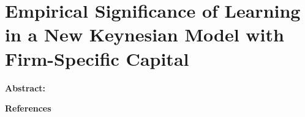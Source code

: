 \chapter{Empirical Significance of Learning in a New Keynesian Model with Firm-Specific Capital}

\noindent \textbf{Abstract:}




\newpage
\noindent\large\textbf{References}\vspace{-5pc}\normalsize

\newpage

